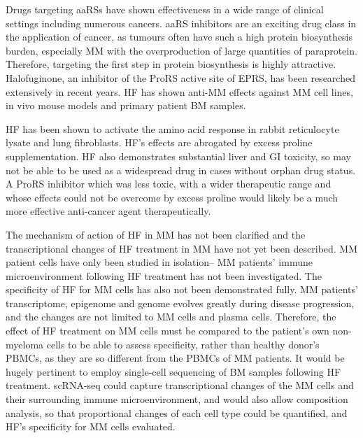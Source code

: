Drugs targeting aaRSs have shown effectiveness in a wide range of clinical settings including numerous cancers.
aaRS inhibitors are an exciting drug class in the application of cancer, as tumours often have such a high protein biosynthesis burden, especially MM with the overproduction of large quantities of paraprotein.
Therefore, targeting the first step in protein biosynthesis is highly attractive.
Halofuginone, an inhibitor of the ProRS active site of EPRS, has been researched extensively in recent years.
HF has shown anti-MM effects against MM cell lines, in vivo mouse models and primary patient BM samples.

HF has been shown to activate the amino acid response in rabbit reticulocyte lysate and lung fibroblasts.
HF's effects are abrogated by excess proline supplementation.
HF also demonstrates substantial liver and GI toxicity, so may not be able to be used as a widespread drug in cases without orphan drug status.
A ProRS inhibitor which was less toxic, with a wider therapeutic range and whose effects could not be overcome by excess proline would likely be a much more effective anti-cancer agent therapeutically.

The mechanism of action of HF in MM has not been clarified and the transcriptional changes of HF treatment in MM have not yet been described.
MM patient cells have only been studied in isolation-- MM patients' immune microenvironment following HF treatment has not been investigated.
The specificity of HF for MM cells has also not been demonstrated fully.
MM patients' transcriptome, epigenome and genome evolves greatly during disease progression, and the changes are not limited to MM cells and plasma cells.
Therefore, the effect of HF treatment on MM cells must be compared to the patient's own non-myeloma cells to be able to assess specificity, rather than healthy donor's PBMCs, as they are so different from the PBMCs of MM patients.
It would be hugely pertinent to employ single-cell sequencing of BM samples following HF treatment.
scRNA-seq could capture transcriptional changes of the MM cells and their surrounding immune microenvironment, and would also allow composition analysis, so that proportional changes of each cell type could be quantified, and HF's specificity for MM cells evaluated.


